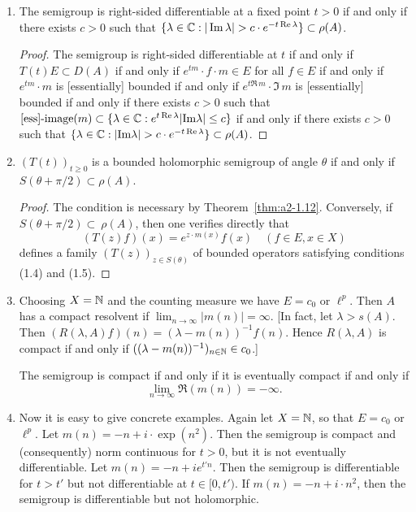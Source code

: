\begin{example}
\begin{enumerate}[\upshape (i), wide, labelsep=1em, itemsep=1ex]
\item \label{ex:a2-1.28-2}
The semigroup is right-sided differentiable at a fixed point
$t > 0$ 
if and only if there exists $c > 0$ such that 
$\{\lambda \in \mathbb{C} : |\mathop{}\!\mathrm{Im}\, \lambda| > c \cdot e^{-t\mathop{}\!\mathrm{Re}\,\lambda}\} \subset \rho(A)$.

\begin{proof}
The semigroup is right-sided differentiable at $t$ 
if and only if $T(t)E \subset D(A)$ 
if and only if $e^{tm} \cdot f \cdot m \in E$ for all $f \in E$ 
if and only if $e^{tm} \cdot m$ is [essentially] bounded 
if and only if $e^{t\Re\, m} \cdot \Im\, m$ is [essentially] bounded 
if and only if there exists $c > 0$ such that 
$[\text{ess}]\text{-}\text{image}(m) \subset 
\{\lambda \in \mathbb{C} : e^{t\mathop{}\!\mathrm{Re}\,\lambda}|\text{Im}\lambda| \leq c\}$ 
if and only if there exists $c > 0$ such that 
$\{\lambda \in \mathbb{C} : |\text{Im}\lambda| > c \cdot e^{-t\mathop{}\!\mathrm{Re}\,\lambda}\} \subset \rho(A)$.
\end{proof}

\item \label{ex:a2-1.28-3}
$(T(t))_{t \geq 0}$ is a bounded holomorphic semigroup of angle $\theta$ if and only if \\
$S(\theta + \pi/2) \subset \rho(A)$.

\begin{proof}
The condition is necessary by Theorem~\ref{thm:a2-1.12}.
Conversely, if $S(\theta + \pi/2) \subset~\rho(A)$, 
then one verifies directly that 
\[
(T(z)f)(x) = e^{z \cdot m(x)}f(x) \quad (f \in E, x \in X) 
\]
defines a family $(T(z))_{z \in S(\theta)}$ of bounded operators satisfying conditions (1.4) and (1.5).
\end{proof}

\item \label{ex:a2-1.28-4}
Choosing $X = \mathbb{N}$ and the counting measure we have $E = c_{0}$ or $\ell^{p}$.
Then $A$ has a compact resolvent if 
$\lim_{n \to \infty} |m(n)| = \infty$.
[In fact, let $\lambda > s(A)$.
Then $(R(\lambda,A)f)(n) = (\lambda-m(n))^{-1}f(n)$.
Hence $R(\lambda,A)$ is compact if and only if $((\lambda-m(n))^{-1})_{n \in \mathbb{N}} \in c_{0}$.]

The semigroup is compact if and only if it is eventually compact if and only if 
\[
\lim_{n \to \infty} \Re(m(n)) = -\infty.
\]

\item \label{ex:a2-1.28-5}
Now it is easy to give concrete examples.
Again let $X = \mathbb{N}$, so that $E = c_{0}$ or $\ell^{p}$.
Let $m(n) = -n + i \cdot \exp(n^2)$.
Then the semigroup is compact and (consequently) norm continuous for $t > 0$, but it is not eventually differentiable.
Let $m(n) = -n + ie^{t'n}$.
Then the semigroup is differentiable for $t > t'$ but not differentiable at $t \in [0,t')$.
If $m(n) = -n + i \cdot n^2$, then the semigroup is differentiable but not holomorphic.
\end{enumerate}
\end{example}	

